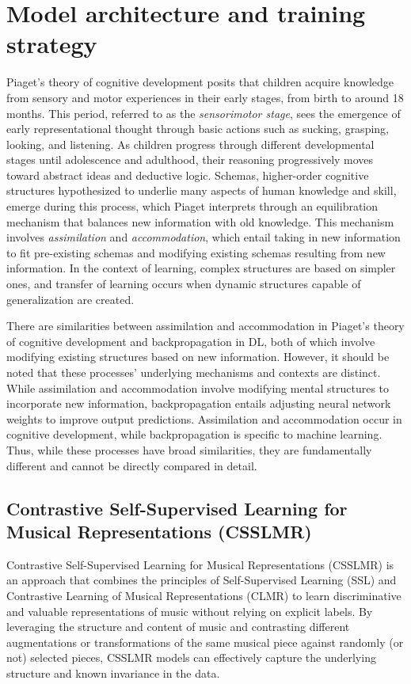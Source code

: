 \section{Model architecture and training strategy}
Piaget's theory of cognitive development \cite{Piagets_Theory_of_Cognitive_Development} posits that children acquire knowledge from sensory and motor experiences in their early stages, from birth to around 18 months. This period, referred to as the \textit{sensorimotor stage}, sees the emergence of early representational thought through basic actions such as sucking, grasping, looking, and listening. As children progress through different developmental stages until adolescence and adulthood, their reasoning progressively moves toward abstract ideas and deductive logic. Schemas, higher-order cognitive structures hypothesized to underlie many aspects of human knowledge and skill, emerge during this process, which Piaget interprets through an equilibration mechanism that balances new information with old knowledge. This mechanism involves \textit{assimilation} and \textit{accommodation}, which entail taking in new information to fit pre-existing schemas and modifying existing schemas resulting from new information. In the context of learning, complex structures are based on simpler ones, and transfer of learning occurs when dynamic structures capable of generalization are created. \cite{audioselfsupsurvey}

There are similarities between assimilation and accommodation in Piaget's theory of cognitive development and backpropagation in DL, both of which involve modifying existing structures based on new information. However, it should be noted that these processes' underlying mechanisms and contexts are distinct. While assimilation and accommodation involve modifying mental structures to incorporate new information, backpropagation entails adjusting neural network weights to improve output predictions. Assimilation and accommodation occur in cognitive development, while backpropagation is specific to machine learning. Thus, while these processes have broad similarities, they are fundamentally different and cannot be directly compared in detail.

\subsection{Contrastive Self-Supervised Learning for Musical Representations (CSSLMR)}

Contrastive Self-Supervised Learning for Musical Representations (CSSLMR) is an approach that combines the principles of Self-Supervised Learning (SSL) and Contrastive Learning of Musical Representations (CLMR) to learn discriminative and valuable representations of music without relying on explicit labels. By leveraging the structure and content of music and contrasting different augmentations or transformations of the same musical piece against randomly (or not) selected pieces, CSSLMR models can effectively capture the underlying structure and known invariance in the data.

